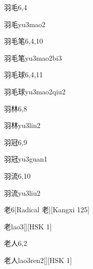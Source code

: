 \begin{entry}{羽毛}{6,4}
  \begin{phonetics}{羽毛}{yu3mao2}
  \end{phonetics}
\end{entry}

\begin{entry}{羽毛笔}{6,4,10}
  \begin{phonetics}{羽毛笔}{yu3mao2bi3}
  \end{phonetics}
\end{entry}

\begin{entry}{羽毛球}{6,4,11}
  \begin{phonetics}{羽毛球}{yu3mao2qiu2}
  \end{phonetics}
\end{entry}

\begin{entry}{羽林}{6,8}
  \begin{phonetics}{羽林}{yu3lin2}
  \end{phonetics}
\end{entry}

\begin{entry}{羽冠}{6,9}
  \begin{phonetics}{羽冠}{yu3guan1}
  \end{phonetics}
\end{entry}

\begin{entry}{羽流}{6,10}
  \begin{phonetics}{羽流}{yu3liu2}
  \end{phonetics}
\end{entry}

\begin{entry}{老}{6}[Radical 老][Kangxi 125]
  \begin{phonetics}{老}{lao3}[][HSK 1]
  \end{phonetics}
\end{entry}

\begin{entry}{老人}{6,2}
  \begin{phonetics}{老人}{lao3ren2}[][HSK 1]
  \end{phonetics}
\end{entry}


